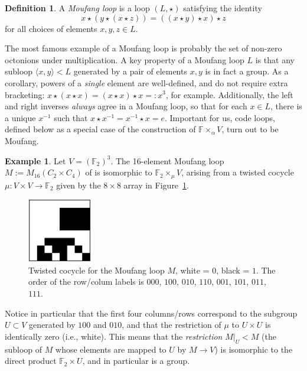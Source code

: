 \documentclass{article}
\theoremstyle{plain}
\theoremstyle{definition}
\newtheorem*{definition}{Definition}
\newtheorem{example}{Example}
\def \FF {\mathbb{F}}
\begin{document}
\begin{definition}
A \emph{Moufang loop} is a loop $(L,\star)$ satisfying the identity
\[
x \star (y \star (x \star z)) = ((x \star y) \star x) \star z
\]
for all choices of elements $x,y,z\in L$.
\end{definition}

The most famous example of a Moufang loop is probably the set of non-zero octonions under multiplication. 
A key property of a Moufang loop $L$ is that any subloop $\langle x,y\rangle < L$ generated by a pair of elements $x,y$ is in fact a group. 
As a corollary, powers of a \emph{single} element are well-defined, and do not require extra bracketing: $x\star (x \star x) = (x\star x) \star x =: x^3$, for example. 
Additionally, the left and right inverses \emph{always} agree in a Moufang loop, so that for each $x\in L$, there is a unique $x^{-1}$ such that $x\star x^{-1} = x^{-1}\star x = e$. 
Important for us, code loops, defined below as a special case of the construction of $\FF\times_\alpha V$, turn out to be Moufang.

\begin{example}\label{example:m16}
Let $V= (\FF_2)^3$. The 16-element Moufang loop $M := M_{16}(C_2\times C_4)$ of \cite[Theorem 2]{Chein} is isomorphic to $\FF_2 \times_\mu V$,  arising from a twisted cocycle $\mu\colon V\times V\to\FF_2$ given by the $8\times 8$ array in Figure~\ref{fig:cocycle for M}.
\medskip
\begin{figure}[!hb]
\begin{center}
\includegraphics[width=0.25\textwidth]{m16.png}
\end{center}
\caption{Twisted cocycle for the Moufang loop $M$, white = $0$, black = $1$. The order of the row/colum labels is $000$, $100$, $010$, $110$, $001$, $101$, $011$, $111$. }\label{fig:cocycle for M}
\end{figure}


Notice in particular that the first four columns/rows correspond to the subgroup $U\subset V$ generated by $100$ and $010$, and that the restriction of $\mu$ to $U\times U$ is identically zero (i.e., white). 
This means that the \emph{restriction} $M\big|_U < M$ (the subloop of $M$ whose elements are mapped to $U$ by $M \to V$) is isomorphic to the direct product $\FF_2\times U$, and in particular is a group.
\end{example}
\end{document}
